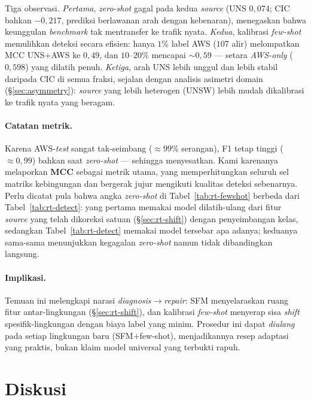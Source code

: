\documentclass[11pt,a4paper]{article}
\begin{document}
Tiga observasi. \emph{Pertama}, \emph{zero-shot} gagal pada kedua \emph{source}
(UNS $0{,}074$; CIC bahkan $-0{,}217$, prediksi berlawanan arah dengan kebenaran),
menegaskan bahwa keunggulan \emph{benchmark} tak mentransfer ke trafik nyata.
\emph{Kedua}, kalibrasi \emph{few-shot} memulihkan deteksi secara efisien: hanya
$1\%$ label AWS ($107$ alir) melompatkan MCC UNS$+$AWS ke $0{,}49$, dan $10$--$20\%$
mencapai $\sim 0{,}59$ --- setara \emph{AWS-only} ($0{,}598$) yang dilatih penuh.
\emph{Ketiga}, arah UNS lebih unggul dan lebih stabil daripada CIC di semua fraksi,
sejalan dengan analisis asimetri domain (\S\ref{sec:asymmetry}): \emph{source}
yang lebih heterogen (UNSW) lebih mudah dikalibrasi ke trafik nyata yang beragam.

\paragraph{Catatan metrik.} Karena AWS-\emph{test} sangat tak-seimbang ($\approx 99\%$
serangan), F1 tetap tinggi ($\approx 0{,}99$) bahkan saat \emph{zero-shot} --- sehingga
menyesatkan. Kami karenanya melaporkan \textbf{MCC} sebagai metrik utama, yang
memperhitungkan seluruh sel matriks kebingungan dan bergerak jujur mengikuti
kualitas deteksi sebenarnya. Perlu dicatat pula bahwa angka \emph{zero-shot} di
Tabel~\ref{tab:rt-fewshot} berbeda dari Tabel~\ref{tab:rt-detect}: yang pertama
memakai model dilatih-ulang dari fitur \emph{source} yang telah dikoreksi satuan
(\S\ref{sec:rt-shift}) dengan penyeimbangan kelas, sedangkan Tabel~\ref{tab:rt-detect}
memakai model tersebar apa adanya; keduanya sama-sama menunjukkan kegagalan
\emph{zero-shot} namun tidak dibandingkan langsung.

\paragraph{Implikasi.} Temuan ini melengkapi narasi \emph{diagnosis}$\to$\emph{repair}:
SFM menyelaraskan ruang fitur antar-lingkungan (\S\ref{sec:rt-shift}), dan kalibrasi
\emph{few-shot} menyerap sisa \emph{shift} spesifik-lingkungan dengan biaya label
yang minim. Prosedur ini dapat \emph{diulang} pada setiap lingkungan baru
(SFM$+$few-shot), menjadikannya resep adaptasi yang praktis, bukan klaim model
universal yang terbukti rapuh.

\section{Diskusi}
\label{sec:discussion}
\end{document}
